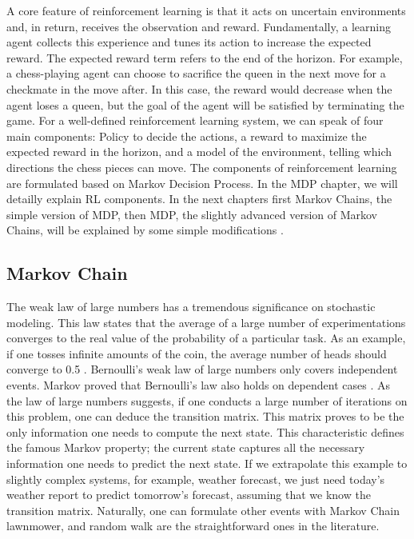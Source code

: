 A core feature of reinforcement learning is that it acts on uncertain environments and, in return, receives the observation and reward. Fundamentally, a learning agent collects this experience and tunes its action to increase the expected reward. The expected reward term refers to the end of the horizon. For example, a chess-playing agent can choose to sacrifice the queen in the next move for a checkmate in the move after. In this case, the reward would decrease when the agent loses a queen, but the goal of the agent will be satisfied by terminating the game. For a well-defined reinforcement learning system, we can speak of four main components: Policy to decide the actions, a reward to maximize the expected reward in the horizon, and a model of the environment, telling which directions the chess pieces can move. The components of reinforcement learning are formulated based on Markov Decision Process. In the MDP chapter, we will detailly explain RL components. In the next chapters first Markov Chains, the simple version of MDP, then MDP, the slightly advanced version of Markov Chains, will be explained by some simple modifications \cite{PerezMIT}.

\subsection{Markov Chain}

The weak law of large numbers has a tremendous significance on stochastic modeling. This law states that the average of a large number of experimentations converges to the real value of the probability of a particular task. As an example, if one tosses infinite amounts of the coin, the average number of heads should converge to 0.5 \cite{Gagniuc2017}. 
Bernoulli’s weak law of large numbers only covers independent events. Markov proved that Bernoulli’s law also holds on dependent cases \cite{Gagniuc2017}. 
As the law of large numbers suggests, if one conducts a large number of iterations on this problem, one can deduce the transition matrix. This matrix proves to be the only information one needs to compute the next state.
This characteristic defines the famous Markov property; the current state captures all the necessary information one needs to predict the next state. If we extrapolate this example to slightly complex systems, for example, weather forecast, we just need today’s weather report to predict tomorrow’s forecast, assuming that we know the transition matrix. Naturally, one can formulate other events with Markov Chain lawnmower, and random walk are the straightforward ones in the literature\cite{Gagniuc2017}.

